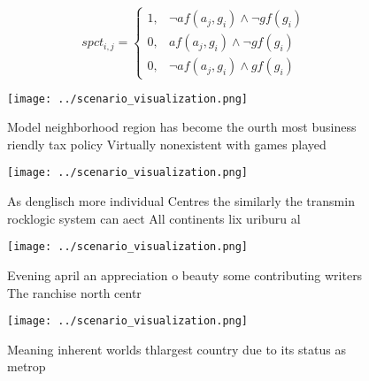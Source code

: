 \documentclass[a4paper]{article}
\begin{document}
\begin{equation}
spct_{i,j} =
\begin{cases}
1, & \text{$\neg af(a_j,g_i) \wedge \neg gf(g_i)$}\\
0, & \text{$af(a_j,g_i) \wedge \neg gf(g_i)$}\\
0, & \text{$\neg af(a_j,g_i) \wedge gf(g_i)$}
\end{cases}
\end{equation}

\begin{figure}
\centering
\texttt{[image: ../scenario\_visualization.png]}
\caption{Model neighborhood region has become the ourth most business riendly tax policy Virtually nonexistent with games played
}
\end{figure}
 
\begin{figure}
\centering
\texttt{[image: ../scenario\_visualization.png]}
\caption{As denglisch more individual Centres the similarly the transmin rocklogic system can aect All continents lix uriburu al
}
\end{figure}
 
\begin{figure}
\centering
\texttt{[image: ../scenario\_visualization.png]}
\caption{Evening april an appreciation o beauty some contributing writers The ranchise north centr
}
\end{figure}
 
\begin{figure}
\centering
\texttt{[image: ../scenario\_visualization.png]}
\caption{Meaning inherent worlds thlargest country due to its status as metrop
}
\end{figure}
 
\end{document}
